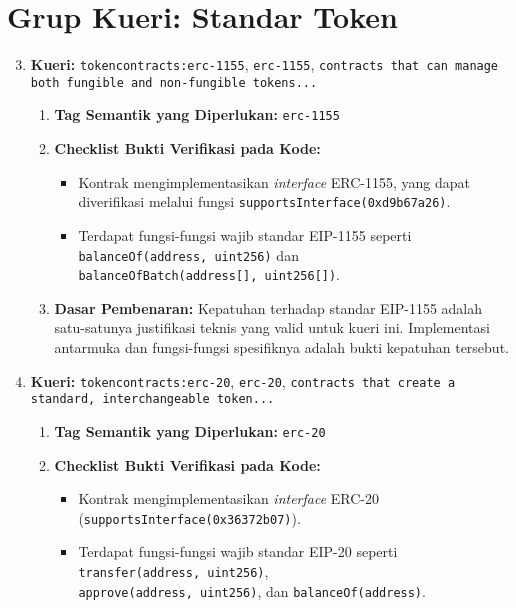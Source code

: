 \section{Grup Kueri: Standar Token}
\begin{enumerate}
	\setcounter{enumi}{2}
	\item \textbf{Kueri:} \texttt{token\textunderscore contracts:erc-1155}, \texttt{erc-1155}, \texttt{contracts that can manage both fungible and non-fungible tokens...}
	      \begin{enumerate}
		      \item \textbf{Tag Semantik yang Diperlukan:} \texttt{erc-1155}
		      \item \textbf{Checklist Bukti Verifikasi pada Kode:}
		            \begin{itemize}
			            \item Kontrak mengimplementasikan \textit{interface} ERC-1155, yang dapat diverifikasi melalui fungsi \texttt{supportsInterface(0xd9b67a26)}.
			            \item Terdapat fungsi-fungsi wajib standar EIP-1155 seperti \\\texttt{balanceOf(address, uint256)} dan \\\texttt{balanceOfBatch(address[], uint256[])}.
		            \end{itemize}
		      \item \textbf{Dasar Pembenaran:} Kepatuhan terhadap standar EIP-1155 adalah satu-satunya justifikasi teknis yang valid untuk kueri ini. Implementasi antarmuka dan fungsi-fungsi spesifiknya adalah bukti kepatuhan tersebut.
	      \end{enumerate}
	\item \textbf{Kueri:} \texttt{token\textunderscore contracts:erc-20}, \texttt{erc-20}, \texttt{contracts that create a standard, interchangeable token...}
	      \begin{enumerate}
		      \item \textbf{Tag Semantik yang Diperlukan:} \texttt{erc-20}
		      \item \textbf{Checklist Bukti Verifikasi pada Kode:}
		            \begin{itemize}
			            \item Kontrak mengimplementasikan \textit{interface} ERC-20 \\(\texttt{supportsInterface(0x36372b07)}).
			            \item Terdapat fungsi-fungsi wajib standar EIP-20 seperti \\\texttt{transfer(address, uint256)}, \\\texttt{approve(address, uint256)}, dan \texttt{balanceOf(address)}.

\end{itemize}
\end{enumerate}
\end{enumerate}
